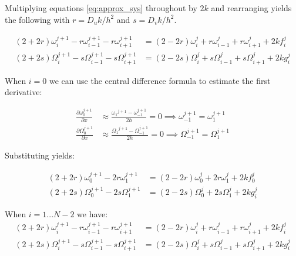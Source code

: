 Multiplying equations \eqref{eq:approx_sys} throughout by $2k$ and rearranging
yields the following with $r = D_u k / h^2$ and $s = D_v k / h^2$.

\begin{subequations} \label{eq:rearranged_approx_sys}
\begin{align}
    (2+2r) \omega_{i}^{j+1} - r \omega_{i-1}^{j+1} - r \omega_{i+1}^{j+1} &=
        (2-2r) \omega_{i}^{j} + r \omega_{i-1}^{j} + r \omega_{i+1}^{j} + 2k f_{i}^{j}
        \\
    (2+2s) \Omega_{i}^{j+1} - s \Omega_{i-1}^{j+1} - s \Omega_{i+1}^{j+1} &=
        (2-2s) \Omega_{i}^{j} + s \Omega_{i-1}^{j} + s \Omega_{i+1}^{j} + 2k g_{i}^{j}
\end{align}
\end{subequations}

When $i=0$ we can use the central difference formula to estimate the first derivative:

\begin{subequations}
\begin{align}
    \frac{\partial \omega_{0}^{j+1}}{\partial x} &\approx \frac{{\omega_1}^{j+1} - \omega_{-1}^{j+1}}{2h} = 0
    \implies  \omega_{-1}^{j+1} = \omega_{1}^{j+1}  \\
    \frac{\partial \Omega_{0}^{j+1}}{\partial x} &\approx \frac{{\Omega_1}^{j+1} - \Omega_{-1}^{j+1}}{2h} = 0
    \implies  \Omega_{-1}^{j+1} = \Omega_{1}^{j+1} 
\end{align}
\end{subequations}

Substituting yields:

\begin{subequations} \label{eq:rearranged_approx_sys_endpoints}
\begin{align}
     (2+2r) \omega_{0}^{j+1} -2 r \omega_{1}^{j+1} &=
        (2-2r) \omega_{0}^{j} +2 r \omega_{1}^{j} + 2k f_{0}^{j}
        \\
    (2+2s) \Omega_{0}^{j+1} - 2s \Omega_{1}^{j+1} &=
        (2-2s) \Omega_{0}^{j} + 2s \Omega_{1}^{j} + 2k g_{i}^{j}
\end{align}
\end{subequations}

When $i=1...N-2$ we have:
\begin{subequations} \label{eq:rearranged_approx_sys}
\begin{align}
    (2+2r) \omega_{i}^{j+1} - r \omega_{i-1}^{j+1} - r \omega_{i+1}^{j+1} &=
        (2-2r) \omega_{i}^{j} + r \omega_{i-1}^{j} + r \omega_{i+1}^{j} + 2k f_{i}^{j}
        \\
    (2+2s) \Omega_{i}^{j+1} - s \Omega_{i-1}^{j+1} - s \Omega_{i+1}^{j+1} &=
        (2-2s) \Omega_{i}^{j} + s \Omega_{i-1}^{j} + s \Omega_{i+1}^{j} + 2k g_{i}^{j}
\end{align}
\end{subequations}

